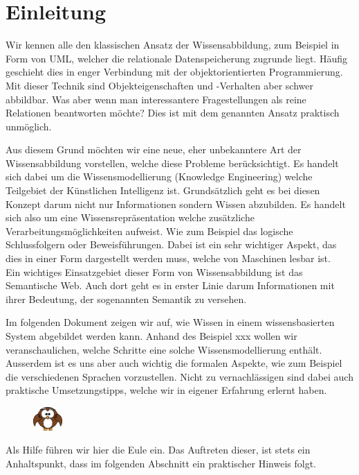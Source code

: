 \chapter{Einleitung}
\label{chap:einleitung}
Wir kennen alle den klassischen Ansatz der Wissensabbildung, zum Beispiel in Form von UML, welcher die relationale Datenspeicherung zugrunde liegt. Häufig geschieht dies in enger Verbindung mit der objektorientierten Programmierung. Mit dieser Technik sind Objekteigenschaften und -Verhalten aber schwer abbildbar. Was aber wenn man interessantere Fragestellungen als reine Relationen beantworten möchte? Dies ist mit dem genannten Ansatz praktisch unmöglich.  

Aus diesem Grund möchten wir eine neue, eher unbekanntere Art der Wissensabbildung vorstellen, welche diese Probleme berücksichtigt. Es handelt sich dabei um die Wissensmodellierung (Knowledge Engineering) welche Teilgebiet der Künstlichen Intelligenz ist. Grundsätzlich geht es bei diesen Konzept darum nicht nur Informationen sondern Wissen abzubilden. Es handelt sich also um eine Wissensrepräsentation welche zusätzliche Verarbeitungsmöglichkeiten aufweist. Wie zum Beispiel  das logische Schlussfolgern oder Beweisführungen. Dabei ist ein sehr wichtiger Aspekt, das dies in einer Form dargestellt werden muss, welche von  Maschinen lesbar ist.\cite{ISpekOntoGeschichte}\\
Ein wichtiges Einsatzgebiet dieser Form von Wissensabbildung ist das Semantische Web. Auch dort geht es in erster Linie darum Informationen mit ihrer Bedeutung, der sogenannten Semantik zu versehen. 


Im folgenden Dokument zeigen wir auf, wie Wissen in einem wissensbasierten System abgebildet werden kann. Anhand des Beispiel xxx wollen wir veranschaulichen, welche Schritte eine solche Wissensmodellierung enthält. Ausserdem ist es uns aber auch wichtig die formalen Aspekte, wie zum Beispiel die verschiedenen Sprachen vorzustellen. Nicht zu vernachlässigen sind dabei auch praktische Umsetzungstipps, welche wir in eigener Erfahrung erlernt haben.

\vspace{10pt}
\begin{figure}
    \vspace{-19pt}
    \includegraphics[width=0.1\textwidth]{bilder/owl.png}
\end{figure}
Als Hilfe führen wir hier die Eule ein. Das Auftreten dieser, ist stets ein Anhaltspunkt, dass im folgenden Abschnitt ein praktischer Hinweis folgt.


